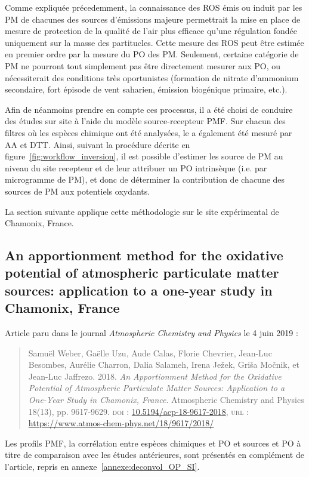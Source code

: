 Comme expliquée précedemment, la connaissance des ROS émis ou induit par les PM de
chacunes des sources d'émissions majeure permettrait la mise en place de mesure de
protection de la qualité de l'air plus efficace qu'une régulation fondée uniquement sur la
masse des partitucles.
Cette mesure des ROS peut être estimée en premier ordre par la mesure du PO des PM.
Seulement, certaine catégorie de PM ne pourront tout simplement pas être directement
mesurer aux PO, ou nécessiterait des conditions très oportunistes (formation de nitrate
d'ammonium secondaire, fort épisode de vent saharien, émission biogénique primaire, etc.).

Afin de néanmoins prendre en compte ces processus, il a été choisi de conduire des études
sur site à l'aide du modèle source-recepteur PMF. Sur chacun des filtres où les espèces
chimique ont été analysées, le \POv{} a également été mesuré par AA et DTT. Ainsi, suivant
la procédure décrite en figure~\ref{fig:workflow_inversion}, il est possible d'estimer les
source de PM au niveau du site recepteur et de leur attribuer un PO intrinsèque (i.e. par
microgramme de PM), et donc de déterminer la contribution de chacune des sources de PM aux
potentiels oxydants.

La section suivante applique cette méthodologie sur le site expérimental de Chamonix,
France.

\subsection{An apportionment method for the oxidative potential of atmospheric particulate
matter sources: application to a one-year study in Chamonix, France}
\label{sec:weber_et_al_2018}

\begin{tcolorbox}[colback=red!5!white,colframe=Melon,title=Note]
Article paru dans le journal \textit{Atmospheric Chemistry and Physics} le 4 juin 2019 :

\begin{quote}
    Samuël Weber, Gaëlle Uzu, Aude Calas, Florie Chevrier, Jean-Luc Besombes,
    Aurélie Charron, Dalia Salameh, Irena Ježek, Griša Močnik, et Jean-Luc Jaffrezo. 2018.
    \textit{An Apportionment Method for the Oxidative Potential of Atmospheric Particulate
    Matter Sources: Application to a One-Year Study in Chamonix, France}. Atmospheric
    Chemistry and Physics 18(13), pp. 9617‑9629.
    \textsc{doi} : \href{https://doi.org/10.5194/acp-18-9617-2018}{10.5194/acp-18-9617-2018},
    \textsc{url} : \url{https://www.atmos-chem-phys.net/18/9617/2018/}
\end{quote}

Les profils PMF, la corrélation entre espèces chimiques et PO et sources et
PO à titre de comparaison avec les études antérieures, sont présentés en complément de
l'article, repris en annexe~\ref{annexe:deconvol_OP_SI}.
\end{tcolorbox}

